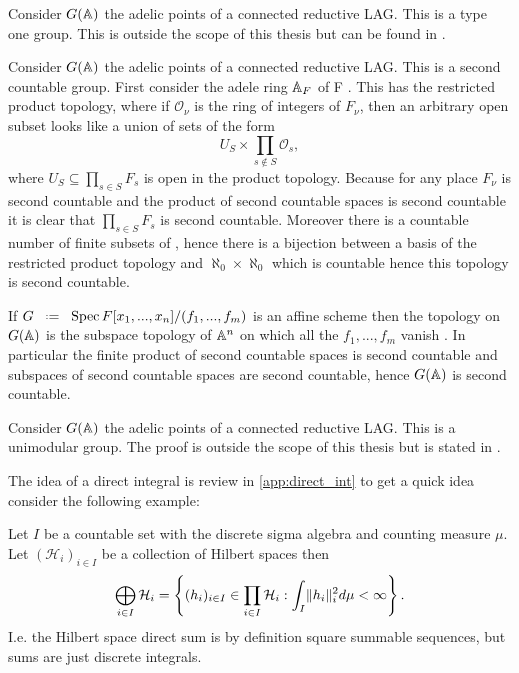 \begin{example}
	Consider \(G(\A)\) the adelic points of a connected reductive LAG. This is a type one group. This is outside the scope of this thesis but can be found in \cite[Thm. 1.7 + Thm. 2.3]{deitmarTraceClassGroups2017}.
\end{example}

\begin{example}
	Consider \(G(\A)\) the adelic points of a connected reductive LAG. This is a second countable group. First consider the adele ring \(\A_F\) of F . This has the restricted product topology, where if \(\mathcal{O}_\nu\) is the ring of integers of \(F_\nu\), then an arbitrary open subset looks like a union of sets of the form 
	\[U_S \times \prod_{s\notin S} \mathcal{O}_s,\]
	where \(U_S\subseteq \prod_{s\in S}F_s\) is open in the product topology. 
	Because for any place \(F_\nu\) is second countable and the product of second countable spaces is second countable it is clear that \(\prod_{s\in S} F_s\) is second countable. Moreover there is a countable number of finite subsets of \Z, hence there is a bijection between a basis of the restricted product topology and \(\aleph_0\times \aleph_0 \) which is countable hence this topology is second countable.
	
	If \(G \defeq \Spec F[x_1, ..., x_n]/(f_1, ..., f_m)\) is an affine scheme then the topology on \(G(\A)\) is the subspace topology of \(\A^n\) on which all the \(f_1, ..., f_m\) vanish \cite{conradWeilGrothendieckApproaches2012}. In particular the finite product of second countable spaces is second countable and subspaces of second countable spaces are second countable, hence \(G(\A)\) is second countable. 
\end{example}

\begin{example}
	Consider \(G(\A)\) the adelic points of a connected reductive LAG. This is a unimodular group. The proof is outside the scope of this thesis but is stated in \cite[Lem. 2]{conradStanfordNumberTheory}.
\end{example}

The idea of a direct integral is review in \ref{app:direct_int} to get a quick idea consider the following example:
\begin{example}
	Let \(I\) be a countable set with the discrete sigma algebra and counting measure \(\mu\). Let \((\mathcal{H}_i)_{i\in I}\) be a collection of Hilbert spaces then
	\[\bigoplus_{i\in I} \mathcal{H}_i = \left\{ (h_i)_{i\in I}\in \prod_{i\in I} \mathcal{H}_i : \int_I \lVert h_i \rVert_i^2 d\mu <\infty \right\}.\]
	I.e. the Hilbert space direct sum is by definition square summable sequences, but sums are just discrete integrals.
\end{example}

